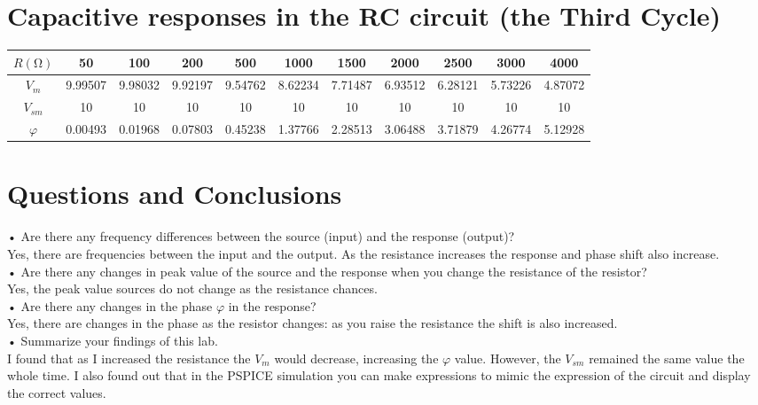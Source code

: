 \documentclass[a4paper]{article}
\begin{document}
\section*{Capacitive responses in the RC circuit (the Third Cycle)}
\begin{tabular}{|c|c|c|c|c|c|c|c|c|c|c|}
\hline
$R(\si{\ohm})$ & 50 & 100 & 200 & 500 & 1000 & 1500 & 2000 & 2500 & 3000 & 4000 \\
\hline
$V_{m}$ & 9.99507 & 9.98032 & 9.92197 & 9.54762 & 8.62234 & 7.71487 & 6.93512 & 6.28121 & 5.73226 & 4.87072 \\
\hline
$V_{sm}$ & 10 & 10 & 10 & 10 & 10 & 10 & 10 & 10 & 10 & 10 \\
\hline
$\si{\varphi}$ & 0.00493 & 0.01968 & 0.07803 & 0.45238 & 1.37766 & 2.28513 & 3.06488 & 3.71879 & 4.26774 & 5.12928 \\
\hline
\end{tabular}

\section*{Questions and Conclusions}
• Are there any frequency differences between the source (input) and the response (output)? \\
Yes, there are frequencies between the input and the output. As the resistance increases the response and phase shift also increase. \\
• Are there any changes in peak value of the source and the response when you change the resistance of the resistor? \\
Yes, the peak value sources do not change as the resistance chances. \\
• Are there any changes in the phase $\si{\varphi}$ in the response? \\
Yes, there are changes in the phase as the resistor changes: as you raise the resistance the shift is also increased. \\
• Summarize your findings of this lab. \\
I found that as I increased the resistance the $V_{m}$ would decrease, increasing the $\si{\varphi}$ value. However, the $V_{sm}$ remained the same value the whole time. I also found out that in the PSPICE simulation you can make expressions to mimic the expression of the circuit and display the correct values.
\end{document}
